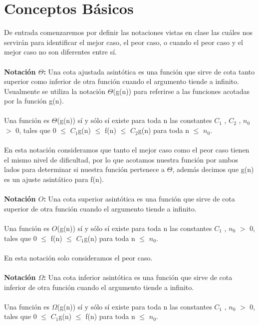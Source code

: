 \documentclass[12pt,twoside]{article}
\begin{document}
\section{Conceptos B\'asicos}
De entrada comenzaremos por definir las notaciones vistas en clase las cu\'ales nos servir\'an para identificar el mejor caso, el peor caso, o cuando el peor caso y el mejor caso no son diferentes entre s\'i.\\\\
{\bf Notaci\'on $\Theta$:} Una cota ajustada asint\'otica es una funci\'on que sirve de cota tanto superior como inferior de otra funci\'on cuando el argumento tiende a infinito. Usualmente se utiliza la notaci\'on $\Theta$(g(n)) para referirse a las funciones acotadas por la funci\'on g(n).\\\\
Una funci\'on es $\Theta$(g(n)) s\'i y s\'olo s\'i existe para toda n las constantes $C_{1}$ , $C_{2}$ , $n_{0}$ $>$ 0, tales que 0 $\leq$ $C_{1}$g(n) $\leq$ f(n) $\leq$ $C_{2}$g(n) para toda n $\leq$ $n_{0}$.\\\\
En esta notaci\'on consideramos que tanto el mejor caso como el peor caso tienen el mismo nivel de dificultad, por lo que acotamos nuestra funci\'on por ambos lados para determinar si nuestra funci\'on pertenece a $\Theta$, adem\'as decimos que g(n) es un ajuste asint\'atico para f(n).\\\\
{\bf Notaci\'on $O$:} Una cota superior asint\'otica es una funci\'on que sirve de cota superior de otra funci\'on cuando el argumento tiende a infinito.\\\\
Una funci\'on es $O$(g(n)) s\'i y s\'olo s\'i existe para toda n las constantes $C_{1}$ , $n_{0}$ $>$ 0, tales que 0 $\leq$ f(n) $\leq$ $C_{1}$g(n) para toda n $\leq$ $n_{0}$.\\\\
En esta notaci\'on solo consideramos el peor caso.\\\\
{\bf Notaci\'on $\Omega$:} Una cota inferior asint\'otica es una funci\'on que sirve de cota inferior de otra funci\'on cuando el argumento tiende a infinito. \\\\
Una funci\'on es $\Omega$(g(n)) s\'i y s\'olo s\'i existe para toda n las constantes $C_{1}$ , $n_{0}$ $>$ 0, tales que 0 $\leq$ $C_{1}$g(n) $\leq$ f(n) para toda n $\leq$ $n_{0}$.\\\\
\end{document}
